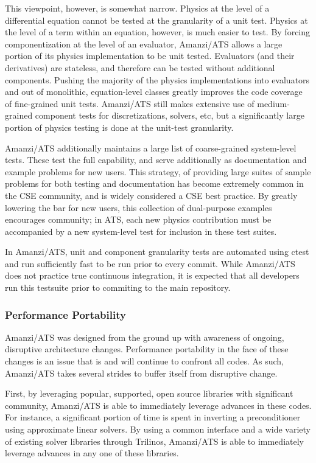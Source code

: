 This viewpoint, however, is somewhat narrow.
Physics at the level of a differential equation cannot be tested at the granularity of a unit test.
Physics at the level of a term within an equation, however, is much easier to test.
By forcing componentization at the level of an evaluator, Amanzi/ATS allows a large portion of its physics implementation to be unit tested.
Evaluators (and their derivatives) are stateless, and therefore can be tested without additional components.
Pushing the majority of the physics implementations into evaluators and out of monolithic, equation-level classes greatly improves the code coverage of fine-grained unit tests.
Amanzi/ATS still makes extensive use of medium-grained component tests for discretizations, solvers, etc, but a significantly large portion of physics testing is done at the unit-test granularity.

Amanzi/ATS additionally maintains a large list of coarse-grained system-level tests.
These test the full capability, and serve additionally as documentation and example problems for new users.
This strategy, of providing large suites of sample problems for both testing and documentation has become extremely common in the CSE community, and is widely considered a CSE best practice.
By greatly lowering the bar for new users, this collection of dual-purpose examples encourages community; in ATS, each new physics contribution must be accompanied by a new system-level test for inclusion in these test suites.

In Amanzi/ATS, unit and component granularity tests are automated using ctest and run sufficiently fast to be run prior to every commit.
While Amanzi/ATS does not practice true continuous integration, it is expected that all developers run this testsuite prior to commiting to the main repository.


\subsubsection{Performance Portability}
\label{sec:amanzi:performance}
%
Amanzi/ATS was designed from the ground up with awareness of ongoing, disruptive architecture changes.
Performance portability in the face of these changes is an issue that is and will continue to confront all codes.
As such, Amanzi/ATS takes several strides to buffer itself from disruptive change.

First, by leveraging popular, supported, open source libraries with significant community, Amanzi/ATS is able to immediately leverage advances in these codes.
For instance, a significant portion of time is spent in inverting a preconditioner using approximate linear solvers.
By using a common interface and a wide variety of existing solver libraries through Trilinos, Amanzi/ATS is able to immediately leverage advances in any one of these libraries.


